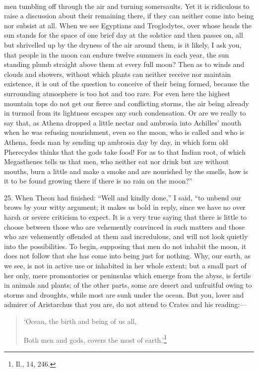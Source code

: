 \documentclass[a4paper, 11pt, oneside, polutonikogreek, english]{article}
\begin{document}
\paragraph{}
men tumbling off through the air and turning somersaults. Yet it is ridiculous to raise a discussion about their remaining there, if they can neither come into being nor subsist at all. When we see Egyptians and Troglodytes, over whose heads the sun stands for the space of one brief day at the solstice and then passes on, all but shrivelled up by the dryness of the air around them, is it likely, I ask you, that people in the moon can endure twelve summers in each year, the sun standing plumb straight above them at every full moon? Then as to winds and clouds and showers, without which plants can neither receive nor maintain existence, it is out of the question to conceive of their being formed, because the surrounding atmosphere is too hot and too rare. For even here the highest mountain tops do not get our fierce and conflicting storms, the air being already in turmoil from its lightness escapes any such condensation. Or are we really to say that, as Athena dropped a little nectar and ambrosia into Achilles' mouth when he was refusing nourishment, even so the moon, who is called and who is Athena, feeds man by sending up ambrosia day by day, in which form old Pherecydes thinks that the gods take food! For as to that Indian root, of which Megasthenes tells us that men, who neither eat nor drink but are without mouths, burn a little and make a smoke and are nourished by the smells, how is it to be found growing there if there is no rain on the moon?''

25. When Theon had finished: ``Well and kindly done,'' I said, ``to unbend our brows by your witty argument; it makes us bold in reply, since we have no over harsh or severe criticism to expect. It is a very true saying that there is little to choose between those who are vehemently convinced in such matters and those who are vehemently offended at them and incredulous, and will not look quietly into the possibilities. To begin, supposing that men do not inhabit the moon, it does not follow that she has come into being just for nothing. Why, our earth, as we see, is not in active use or inhabited in her whole extent; but a small part of her only, mere promontories or peninsulas which emerge from the abyss, is fertile in animals and plants; of the other parts, some are desert and unfruitful owing to storms and droughts, while most are sunk under the ocean. But you, lover and admirer of Aristarchus that you are, do not attend to Crates and his reading:---
\begin{quotation}
`Ocean, the birth and being of us all,

Both men and gods, covers the most of earth.'\footnote{Il., 14, 246.}
\end{quotation}
\end{document}
